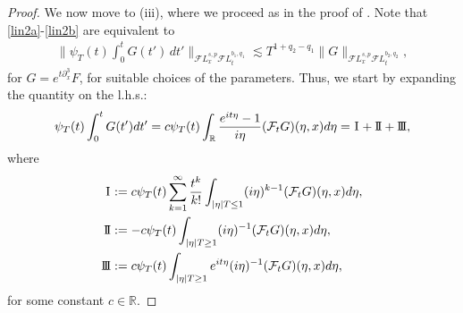 \documentclass[a4paper,
11pt,  reqno]{amsart}
\newcommand{\I}{\hspace{0.2mm}\textup{I}\hspace{0.2mm}}
\newcommand{\II}{\textup{I \hspace{-2.9mm} I} }
\newcommand{\III}{\textup{I \hspace{-2.9mm} I \hspace{-2.9mm} I}}
\newcommand{\5}{\textup{V}}
\newcommand{\FL}{\mathcal{F} L}
\newcommand{\les}{\lesssim}
\theoremstyle{remark}
\newcommand{\R}{\mathbb{R}}
\numberwithin{equation}{section}
\numberwithin{theorem}{section}
\begin{document}
\begin{proof}
			We now move to (iii), where we proceed as in the proof of \cite[Lemma~2]{Grunrock_mkdv}.
            Note that \eqref{lin2a}-\eqref{lin2b} are equivalent to 
            \begin{align}
                \bigg\| \psi_T (t) \int_0^t G(t') \, dt' \bigg\|_{\FL^{s, p}_x \FL^{b_1, q_1 }_t }
                \les T^{1+ q_2 - q_1} \| G \|_{\FL^{s, p}_x \FL^{b_2 , q_2}_t }, 
            \end{align}
            for $G = e^{t\partial_x^3} F$, for suitable choices of the parameters. Thus, we start by expanding the quantity on the l.h.s.:
			\begin{equation}
				\psi_T(t)\int_0^t G(t') dt' =  c \psi_T (t)\int_\R \frac{e^{it\eta}-1}{i\eta } (\mathcal{F}_t G )(\eta,x) d\eta = \I + \II + \III,
				\label{lin3a}
			\end{equation}
			where
			\begin{equation}
				\label{lin3}
				\begin{aligned}
					\I & :=c\psi_T(t)\sum_{k= 1}^\infty \frac{t^k}{k!}\int_{|\eta| T \le 1} (i\eta)^{k-1} (\mathcal{F}_t G )(\eta,x) d\eta, \\
					\II& :=-c\psi_T (t)\int_{|\eta|T \ge 1} (i\eta)^{-1} (\mathcal{F}_t G )(\eta,x) d\eta , \\
					\III & :=c\psi_T (t)\int_{|\eta| T  \ge 1} e^{it\eta}(i\eta)^{-1} (\mathcal{F}_t G )(\eta,x) d\eta,
				\end{aligned}
			\end{equation}
			for some constant $c\in\R$.
			
            
            

\end{proof}
\end{document}
